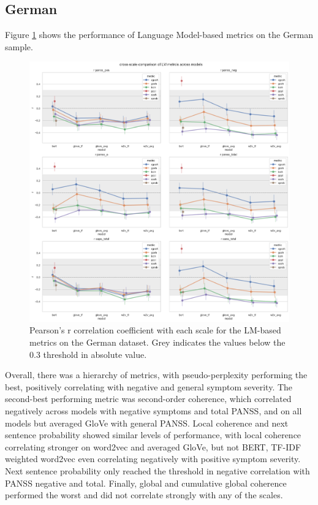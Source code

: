 \subsection{German}

Figure \ref{fig:results:lm:de} shows the performance of Language Model-based metrics on the German sample.

\begin{figure}[h!]
    \includegraphics[width=1.1\textwidth, center]{Figures/chapter_4/LM/de_scale_r.png} 
\captionsetup{width=\textwidth}
\caption[LM Metrics: German]{\label{fig:results:lm:de} Pearson's r correlation coefficient with each scale for the LM-based metrics on the German dataset. Grey indicates the values below the 0.3 threshold in absolute value.}
\end{figure}

Overall, there was a hierarchy of metrics, with pseudo-perplexity performing the best, positively correlating with negative and general symptom severity. The second-best performing metric was second-order coherence, which correlated negatively across models with negative symptoms and total PANSS, and on all models but averaged GloVe with general PANSS. Local coherence and next sentence probability showed similar levels of performance, with local coherence correlating stronger on word2vec and averaged GloVe, but not BERT, TF-IDF weighted word2vec even correlating negatively with positive symptom severity. Next sentence probability only reached the threshold in negative correlation with PANSS negative and total. Finally, global and cumulative global coherence performed the worst and did not correlate strongly with any of the scales.


